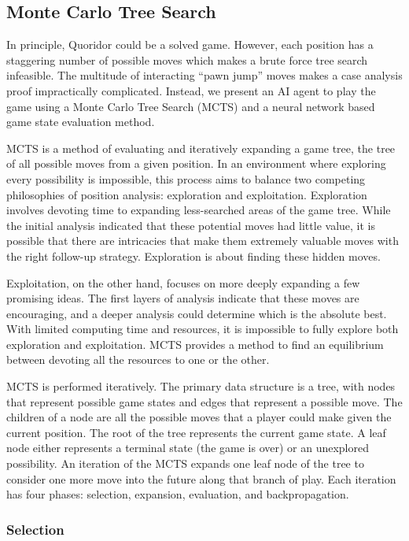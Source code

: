 \documentclass[10pt]{article}
\begin{document}
\subsection{Monte Carlo Tree Search}

In principle, Quoridor could be a solved game. However, each position has a staggering number of possible moves which makes a brute force tree search infeasible. The multitude of interacting ``pawn jump'' moves makes a case analysis proof impractically complicated. Instead, we present an AI agent to play the game using a Monte Carlo Tree Search (MCTS) and a neural network based game state evaluation method.

MCTS is a method of evaluating and iteratively expanding a game tree, the tree of all possible moves from a given position.\cite{russell2020aima} In an environment where exploring every possibility is impossible, this process aims to balance two competing philosophies of position analysis: exploration and exploitation. Exploration involves devoting time to expanding less-searched areas of the game tree. While the initial analysis indicated that these potential moves had little value, it is possible that there are intricacies that make them extremely valuable moves with the right follow-up strategy. Exploration is about finding these hidden moves.

Exploitation, on the other hand, focuses on more deeply expanding a few promising ideas. The first layers of analysis indicate that these moves are encouraging, and a deeper analysis could determine which is the absolute best. With limited computing time and resources, it is impossible to fully explore both exploration and exploitation. MCTS provides a method to find an equilibrium between devoting all the resources to one or the other.

MCTS is performed iteratively. The primary data structure is a tree, with nodes that represent possible game states and edges that represent a possible move. The children of a node are all the possible moves that a player could make given the current position. The root of the tree represents the current game state. A leaf node either represents a terminal state (the game is over) or an unexplored possibility. An iteration of the MCTS expands one leaf node of the tree to consider one more move into the future along that branch of play. Each iteration has four phases: selection, expansion, evaluation, and backpropagation.

\subsubsection{Selection}
\end{document}
